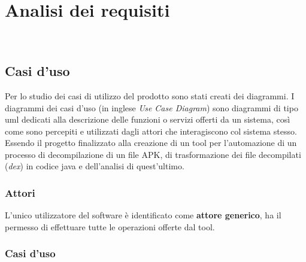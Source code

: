 
\chapter{Analisi dei requisiti}
\label{cap:analisi-requisiti}

\\

\section{Casi d'uso}

Per lo studio dei casi di utilizzo del prodotto sono stati creati dei diagrammi.
I diagrammi dei casi d'uso (in inglese \emph{Use Case Diagram}) sono diagrammi di tipo \gls{uml} dedicati alla descrizione delle funzioni o servizi offerti da un sistema, così come sono percepiti e utilizzati dagli attori che interagiscono col sistema stesso.
Essendo il progetto finalizzato alla creazione di un tool per l'automazione di un processo di decompilazione di un file APK, di trasformazione dei file decompilati (\textit{dex}) in codice java e dell'analisi di quest'ultimo.



\subsection{Attori}\label{sec:attori}
L'unico utilizzatore del software \`{e} identificato come \textbf{attore generico}, ha il permesso di effettuare tutte le operazioni offerte dal tool.

\subsection{Casi d'uso}\label{subsec:casi-d'uso}
